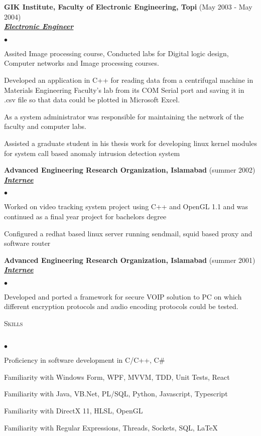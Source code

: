 \documentclass{article}
\newcommand{\lineunder}{\vspace*{-8pt} \\ \hspace*{-18pt} \hrulefill \\}
\newcommand{\header}[1]{{\hspace*{-15pt}\vspace*{6pt} \textsc{#1}} \vspace*{-6pt} \lineunder}
\newcommand{\employer}[3]{{ \textbf{#1} (#2)\\ \underline{\textbf{\emph{#3}}}\\  }}
\newenvironment{achievements}{\begin{list}{$\bullet$}{\topsep 0pt \itemsep -2pt}}{\vspace*{4pt}\end{list}}
\begin{document}
\employer{GIK Institute, Faculty of Electronic Engineering, Topi}{May 2003 - May 2004}{Electronic Engineer}
	\begin{achievements}
	\item Assited Image processing course, Conducted labs for Digital logic design, Computer networks and Image processing courses.
	\item Developed an application in C++ for reading data from a centrifugal machine in Materials Engineering Faculty’s lab from its COM Serial port and saving it in .csv file so that data could be plotted in Microsoft Excel.
	\item As a system administrator was responsible for maintaining the network of the faculty and computer labs.
	\item Assisted a graduate student in his thesis work for developing linux kernel modules for system call based anomaly intrusion detection system
	\end{achievements}

\employer{Advanced Engineering Research Organization, Islamabad}{summer 2002}{Internee}
	\begin{achievements}
	\item Worked on video tracking system project using C++ and OpenGL 1.1 and was continued as a final year project for bachelors degree
	\item Configured a redhat based linux server running sendmail, squid based proxy and software router
	\end{achievements}

\employer{Advanced Engineering Research Organization, Islamabad}{summer 2001}{Internee}
	\begin{achievements}
	\item Developed and ported a framework for secure VOIP solution to PC on which different encryption protocols and audio encoding protocols could be tested.
	\end{achievements}

\header{Skills}
\begin{achievements}
\item Proficiency in software development in C/C++, C\#
\item Familiarity with Windows Form, WPF, MVVM, TDD, Unit Tests, React
\item Familiarity with Java, VB.Net, PL/SQL, Python, Javascript, Typescript
\item Familiarity with DirectX 11, HLSL, OpenGL
\item Familiarity with Regular Expressions, Threads, Sockets, SQL, \LaTeX
\end{achievements}
\end{document}
